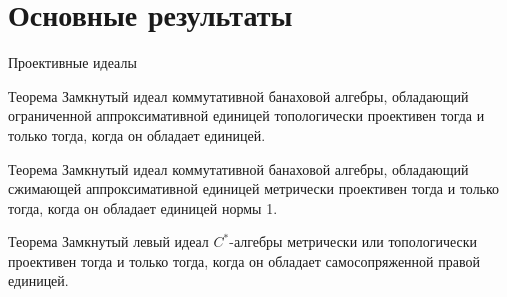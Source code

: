\documentclass[9pt,pdf,utf8,russian]{beamer}
\begin{document}
\section{Основные результаты}

\begin{frame}{Проективные идеалы}
    \begin{alertblock}{Теорема}
        Замкнутый идеал коммутативной банаховой алгебры,
        обладающий ограниченной аппроксимативной
        единицей топологически проективен тогда и только тогда,
        когда он обладает единицей.
    \end{alertblock}
    \pause
    \begin{alertblock}{Теорема}
        Замкнутый идеал коммутативной банаховой алгебры, обладающий
        \alert{сжимающей} аппроксимативной
        единицей \alert{метрически} проективен тогда и только тогда, когда
        он обладает единицей \alert{нормы 1}.
    \end{alertblock}
    \pause
    \begin{alertblock}{Теорема}
        Замкнутый левый идеал \alert{$C^*$-алгебры} метрически или
        топологически проективен тогда и только тогда, когда он обладает
        самосопряженной правой единицей.
    \end{alertblock}
\end{frame}
\end{document}
